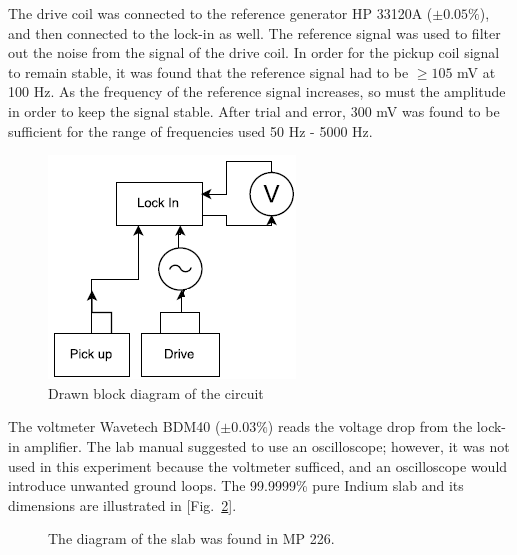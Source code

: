 The drive coil was connected to the reference generator HP 33120A ($\pm 0.05\%$), and then connected to the lock-in as well. The reference signal was used to filter out the noise from the signal of the drive coil. In order for the pickup coil signal to remain stable, it was found that the reference signal had to be $\geq 105$ mV at 100 Hz. As the frequency of the reference signal increases, so must the amplitude in order to keep the signal stable. After trial and error, 300 mV was found to be sufficient for the range of frequencies used 50 Hz -  5000 Hz. 
\vspace*{1mm}
\begin{figure}[H]
    \begin{center}
    \includegraphics[scale=0.75]{helicon_circuit.png}
    \caption{Drawn block diagram of the circuit}
    \label{fig:helicon_circuit}
    \end{center}
\end{figure}
The voltmeter Wavetech BDM40 ($\pm 0.03 \%$) reads the voltage drop from the lock-in amplifier. The lab manual suggested to use an oscilloscope; however, it was not used in this experiment because the voltmeter sufficed, and an oscilloscope would introduce unwanted ground loops. The 99.9999\% pure Indium slab and its dimensions are illustrated in [Fig.~\ref{fig:indiumslab}].
\begin{figure}[h!]
  \caption{The diagram of the slab was found in MP 226.}
  \label{fig:indiumslab}
\end{figure}

